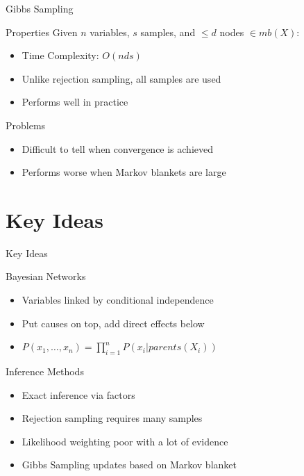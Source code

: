 \documentclass[14pt]{beamer}
\begin{document}
\begin{frame}{Gibbs Sampling}
	\begin{block}{Properties}
		Given $n$ variables, $s$ samples, and $\leq d$ nodes $\in \textit{mb}(X)$:
		\begin{itemize}
			\item Time Complexity: \pause $O(nds)$
			\pause
			\item Unlike rejection sampling, all samples are used
			\pause
			\item Performs well in practice
		\end{itemize}
	\end{block}
	\pause
	\begin{block}{Problems}
		\begin{itemize}
			\item Difficult to tell when convergence is achieved
			\item Performs worse when Markov blankets are large
		\end{itemize}
	\end{block}
\end{frame}


\part{Key Ideas}
\begin{frame}{Key Ideas}
	\begin{block}{Bayesian Networks}
		\begin{itemize}
			\item Variables linked by conditional independence
			\item Put causes on top, add direct effects below
			\item $P(x_{1},\ldots,x_{n}) = \prod\limits_{i=1}^{n}{P(x_{i}|\textit{parents}(X_{i}))}$
		\end{itemize}
	\end{block}
	\begin{block}{Inference Methods}
		\begin{itemize}
			\item Exact inference via factors
			\item Rejection sampling requires many samples
			\item Likelihood weighting poor with a lot of evidence
			\item Gibbs Sampling updates based on Markov blanket
		\end{itemize}
	\end{block}
\end{frame}
\end{document}

